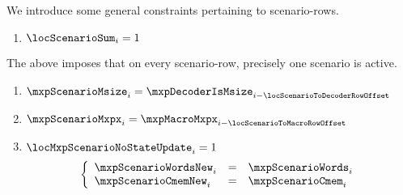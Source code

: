 \begin{center}
\end{center}
We introduce some general constraints pertaining to scenario-rows.
\begin{enumerate}
	\item $\locScenarioSum _{i} = 1$
\end{enumerate}
\saNote{}
The above imposes that on every scenario-row, precisely one scenario is active.
\begin{enumerate}[resume]
	\item
		\label{mxp: constraints: generalities: scenario: setting scn/MSIZE}
		$\mxpScenarioMsize _{i} = \mxpDecoderIsMsize _{i - \locScenarioToDecoderRowOffset}$
	\item
		\label{mxp: constraints: generalities: scenario: setting scn/MXPX}
		$\mxpScenarioMxpx  _{i} = \mxpMacroMxpx      _{i - \locScenarioToMacroRowOffset}$
	\item
		\label{mxp: constraints: generalities: scenario: no change in WORDS or CMEM if no state change scenario}
		\If $\locMxpScenarioNoStateUpdate _{i} = 1$ \Then
		\[
			\left\{ \begin{array}{lcl}
				\mxpScenarioWordsNew _{i} & = & \mxpScenarioWords _{i} \\
				\mxpScenarioCmemNew  _{i} & = & \mxpScenarioCmem  _{i} \\
			\end{array} \right.
		\]
\end{enumerate}
